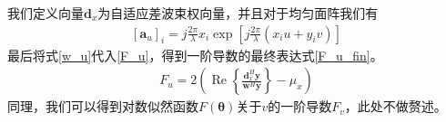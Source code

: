 \documentclass[master]{thesis-uestc}
\begin{document}
我们定义向量$\bm{d}_{x}$为自适应差波束权向量，并且对于均匀面阵我们有
\begin{equation}
    \begin{aligned}
        \left[\bm{a}_u\right]_i = j\frac{2\pi}{\lambda}x_i\exp\left[j\frac{2\pi}{\lambda}(x_iu+y_iv)\right]
    \end{aligned}
\end{equation}
最后将式\eqref{w_u}代入\eqref{F_u}，得到一阶导数的最终表达式\eqref{F_u_fin}。
\begin{equation}\label{F_u_fin}
    \begin{aligned}
        F_u = 2\left(\operatorname{Re}\left\{\frac{\bm{d}_x^H\bm{y}}{\bm{w}^H\bm{y}}\right\}-\mu_x\right)
    \end{aligned}
\end{equation}
同理，我们可以得到对数似然函数$F(\bm{\theta})$关于$v$的一阶导数$F_v$，此处不做赘述。
\end{document}

